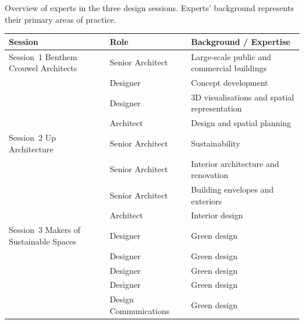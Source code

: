 \begin{maintable}[tbp]
\caption{Overview of experts in the three design sessions. Experts' background represents their primary areas of practice.}
\label{tab:expert-demographics}

\fontsize{8.4}{10.0}\selectfont
\setlength{\tabcolsep}{3pt}
\renewcommand{\arraystretch}{1.06}

\begin{tabularx}{\linewidth}{@{}p{.26\linewidth} p{.23\linewidth} Y@{}}
\toprule
\textbf{Session} & \textbf{Role} & \textbf{Background / Expertise} \\
\midrule

Session~1 Benthem Crouwel Architects &
Senior Architect &
Large-scale public and commercial buildings \\

&
Designer &
Concept development \\

&
Designer &
3D visualisations and spatial representation \\

&
Architect &
Design and spatial planning \\

\midrule

Session~2 Up Architecture &
Senior Architect &
Sustainability \\

&
Senior Architect &
Interior architecture and renovation \\

&
Senior Architect &
Building envelopes and exteriors \\

&
Architect &
Interior design \\

\midrule

Session~3 Makers of Sustainable Spaces &
Designer &
Green design \\

&
Designer &
Green design \\

&
Designer &
Green design \\

&
Designer &
Green design \\

&
Design Communications &
Green design \\

\bottomrule
\end{tabularx}

\end{maintable}


